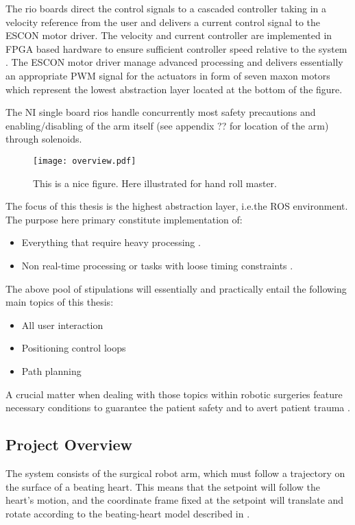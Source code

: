 The \gls{rio} boards direct the control signals to a cascaded controller taking in a velocity reference from the user and delivers a current control signal to the ESCON motor driver. The velocity and current controller are implemented in FPGA based hardware to ensure sufficient controller speed relative to the system \citep{bib:robot_paper}. The ESCON motor driver manage advanced processing and delivers essentially an appropriate PWM signal for the  actuators in form of seven maxon motors which represent the lowest abstraction layer located at the bottom of the figure.

The NI single board \glspl{rio} handle concurrently most safety precautions and enabling/disabling of the arm itself (see appendix ?? for location of the arm) through solenoids.
\begin{figure}[H]
	\center
		\texttt{[image: overview.pdf]}	\caption{This is a nice figure. Here illustrated for hand roll master.}
	\label{fig:overview}
\end{figure}
The focus of this thesis is the highest abstraction layer, i.e.the ROS environment. The purpose here primary constitute implementation of:
\begin{itemize}
\item Everything that require heavy processing \citep{bib:robot_paper}.
\item Non real-time processing or tasks with loose timing constraints \citep{bib:robot_paper}.
\end{itemize}
The above pool of stipulations will essentially and practically entail the following main topics of this thesis:
\begin{itemize}
\item All user interaction
\item Positioning control loops
\item Path planning
\end{itemize}
A crucial matter when dealing with those topics within robotic surgeries feature necessary conditions to guarantee the patient safety and to avert patient trauma \citep{bib:safety}.


\subsection{Project Overview}\label{sec:project_overview}
The system consists of the surgical robot arm, which must follow a trajectory on the surface of a beating heart. This means that the setpoint will follow the heart's motion, and the coordinate frame fixed at the setpoint will translate and rotate according to the beating-heart model described in \citep{bib:heart_model,bib:safety}.

